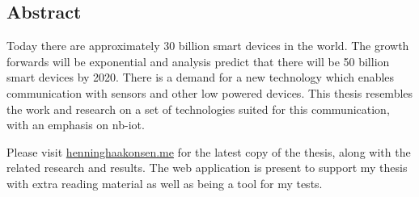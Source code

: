
\vspace*{2cm}
\thispagestyle{plain}

\begin{center}


\section*{Abstract} \label{section:abstract}
\end{center}

Today there are approximately 30 billion smart devices in the world. The growth forwards will be exponential and analysis predict that there will be 50 billion smart devices by 2020. There is a demand for a new technology which enables communication with sensors and other low powered devices. This thesis resembles the work and research on a set of technologies suited for this communication, with an emphasis on \acrshort{nb-iot}.

Please visit \url{henninghaakonsen.me} for the latest copy of the thesis, along with the related research and results. The web application is present to support my thesis with extra reading material as well as being a tool for my tests. 
